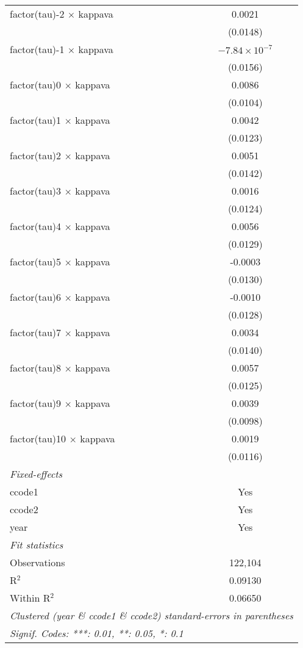 \begin{tabular}{lc}
   factor(tau)-2 $\times$ kappava  & 0.0021\\   
                                   & (0.0148)\\   
   factor(tau)-1 $\times$ kappava  & $-7.84\times 10^{-7}$\\    
                                   & (0.0156)\\   
   factor(tau)0 $\times$ kappava   & 0.0086\\   
                                   & (0.0104)\\   
   factor(tau)1 $\times$ kappava   & 0.0042\\   
                                   & (0.0123)\\   
   factor(tau)2 $\times$ kappava   & 0.0051\\   
                                   & (0.0142)\\   
   factor(tau)3 $\times$ kappava   & 0.0016\\   
                                   & (0.0124)\\   
   factor(tau)4 $\times$ kappava   & 0.0056\\   
                                   & (0.0129)\\   
   factor(tau)5 $\times$ kappava   & -0.0003\\   
                                   & (0.0130)\\   
   factor(tau)6 $\times$ kappava   & -0.0010\\   
                                   & (0.0128)\\   
   factor(tau)7 $\times$ kappava   & 0.0034\\   
                                   & (0.0140)\\   
   factor(tau)8 $\times$ kappava   & 0.0057\\   
                                   & (0.0125)\\   
   factor(tau)9 $\times$ kappava   & 0.0039\\   
                                   & (0.0098)\\   
   factor(tau)10 $\times$ kappava  & 0.0019\\   
                                   & (0.0116)\\   
   \midrule
   \emph{Fixed-effects}\\
   ccode1                          & Yes\\  
   ccode2                          & Yes\\  
   year                            & Yes\\  
   \midrule
   \emph{Fit statistics}\\
   Observations                    & 122,104\\  
   R$^2$                           & 0.09130\\  
   Within R$^2$                    & 0.06650\\  
   \midrule \midrule
   \multicolumn{2}{l}{\emph{Clustered (year \& ccode1 \& ccode2) standard-errors in parentheses}}\\
   \multicolumn{2}{l}{\emph{Signif. Codes: ***: 0.01, **: 0.05, *: 0.1}}\\
\end{tabular}
